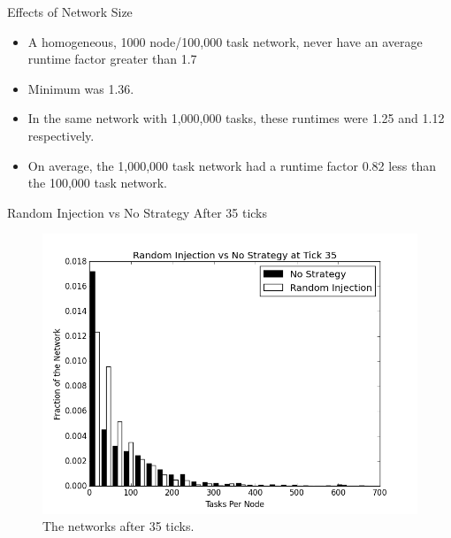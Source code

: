 \documentclass[11pt]{beamer}
\begin{document}
\begin{frame}{Effects of Network Size}
	\begin{itemize}
		\item A homogeneous, 1000 node/100,000 task network, never have an average runtime factor greater than 1.7
		\item Minimum was 1.36.
		\item In the same network with 1,000,000 tasks, these runtimes were 1.25 and 1.12 respectively.
		\item On average, the 1,000,000 task network had a runtime factor 0.82 less than the 100,000 task network.
	\end{itemize}
\end{frame}



\begin{frame}{Random Injection vs No Strategy After 35 ticks}
\begin{figure}
	\centering
	\includegraphics[width=0.7\linewidth]{figs/randomStableHist35}
	\caption[Random injection vs no strategy after 35 ticks.]{The networks after 35 ticks. }
	\label{fig:randomStableHist35}
\end{figure}
\end{frame}
\end{document}
